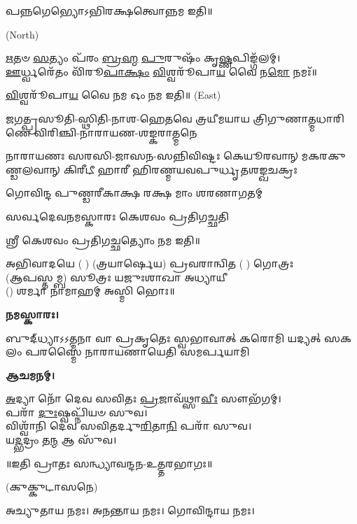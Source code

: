 𑌪𑌨𑍍𑌨𑌗𑍇𑌭𑍍𑌯𑍋𑌽𑌭𑌿𑌰𑌕𑍍𑌷𑌤𑍍𑌵𑍋𑌨𑍍𑌨𑌮 𑌇𑌤𑌿॥

 {\scriptsize (North)}

\-\ul{𑌋}\-𑌤𑍞 \ul{𑌸}\-𑌤𑍍𑌯𑌂 𑌪᳴𑌰𑌂 \ul{𑌬𑍍𑌰}\-\-\ul{𑌹𑍍𑌮} \ul{𑌪𑍁}\-𑌰𑍁𑌷𑌂᳴ 𑌕𑍃\-\ul{𑌷𑍍𑌣}\-𑌪𑌿𑌙𑍍𑌗᳴𑌲𑌮𑍍।\\
\-\ul{𑌊}\-𑌰𑍍𑌧𑍍𑌵𑌰𑍇᳴𑌤𑌂 𑌵𑌿᳴𑌰𑍂\-\ul{𑌪𑌾}\-\-\ul{𑌕𑍍𑌷𑌂} \ul{𑌵𑌿}\-𑌶𑍍𑌵𑌰𑍂᳴𑌪𑌾\-\ul{𑌯} 𑌵𑍈 𑌨\-\ul{𑌮𑍋} 𑌨𑌮𑌃᳴॥


\-\ul{𑌵𑌿}\-𑌶𑍍𑌵𑌰𑍂᳴𑌪𑌾\-\ul{𑌯} 𑌵𑍈 𑌨𑌮 𑌓𑌂 𑌨𑌮 𑌇𑌤𑌿॥
{\scriptsize (East)}

{𑌜𑌗𑌤𑍍𑌪𑍍𑌰𑌸𑍂𑌤𑌿-𑌸𑍍𑌥𑌿𑌤𑌿-𑌨𑌾𑌶-𑌹𑍇𑌤𑌵𑍇}
{𑌤𑍍𑌰𑌯𑍀𑌮𑌯𑌾𑌯 𑌤𑍍𑌰𑌿𑌗𑍁𑌣𑌾𑌤𑍍𑌮𑌧𑌾𑌰𑌿𑌣𑍇}
{𑌵𑌿𑌰𑌿𑌞𑍍𑌚𑌿-𑌨𑌾𑌰𑌾𑌯𑌣-𑌶𑌙𑍍𑌕𑌰𑌾𑌤𑍍𑌮𑌨𑍇}

{𑌨𑌾𑌰𑌾𑌯𑌣𑌃 𑌸𑌰𑌸𑌿-𑌜𑌾𑌸𑌨-𑌸𑌨𑍍𑌨𑌿𑌵𑌿𑌷𑍍𑌟𑌃}
{𑌕𑍇𑌯𑍂𑌰𑌵𑌾𑌨𑍍 𑌮𑌕𑌰𑌕𑍁𑌣𑍍𑌡𑌲𑌵𑌾𑌨𑍍 𑌕𑌿𑌰𑍀𑌟𑍀}
{𑌹𑌾𑌰𑍀 𑌹𑌿𑌰𑌣𑍍𑌮𑌯𑌵𑌪𑍁𑌰𑍍𑌧𑍃𑌤𑌶𑌙𑍍𑌖𑌚𑌕𑍍𑌰𑌃}

{𑌗𑍋𑌵𑌿𑌨𑍍𑌦 𑌪𑍁𑌣𑍍𑌡𑌰𑍀𑌕𑌾𑌕𑍍𑌷 𑌰𑌕𑍍𑌷 𑌮𑌾𑌂 𑌶𑌰𑌣𑌾𑌗𑌤𑌮𑍍}

{𑌸𑌰𑍍𑌵𑌦𑍇𑌵𑌨𑌮𑌸𑍍𑌕𑌾𑌰𑌃 𑌕𑍇𑌶𑌵𑌂 𑌪𑍍𑌰𑌤𑌿𑌗𑌚𑍍𑌛𑌤𑌿}

𑌶𑍍𑌰𑍀 𑌕𑍇𑌶𑌵𑌂 𑌪𑍍𑌰𑌤𑌿𑌗𑌚𑍍𑌛𑌤𑍍𑌯𑍋𑌂 𑌨𑌮 𑌇𑌤𑌿॥

𑌅𑌭𑌿𑌵𑌾𑌦𑌯𑍇 ( ) (𑌤𑍍𑌰𑌯𑌾𑌰𑍍𑌷𑍇𑌯) 𑌪𑍍𑌰𑌵𑌰𑌾𑌨𑍍𑌵𑌿𑌤 ( ) 𑌗𑍋𑌤𑍍𑌰𑌃\\
(𑌆𑌪𑌸𑍍𑌤𑌮𑍍𑌬) 𑌸𑍂𑌤𑍍𑌰𑌃 𑌯𑌜𑍁𑌃𑌶𑌾𑌖𑌾 𑌅𑌧𑍍𑌯𑌾𑌯𑍀\\
() 𑌶𑌰𑍍𑌮𑌾 𑌨𑌾𑌮𑌾𑌹𑌮𑍍 𑌅𑌸𑍍𑌮𑌿 𑌭𑍋𑌃॥

\textbf{𑌨𑌮𑌸𑍍𑌕𑌾𑌰𑌃।}

{𑌬𑍁𑌦𑍍‌𑌧𑍍𑌯𑌾𑌽𑌽𑌤𑍍𑌮𑌨𑌾 𑌵𑌾 𑌪𑍍𑌰𑌕𑍃𑌤𑍇𑌃 𑌸𑍍𑌵𑌭𑌾𑌵𑌾𑌤𑍍}
{𑌕𑌰𑍋𑌮𑌿 𑌯𑌦𑍍𑌯𑌤𑍍 𑌸𑌕𑌲𑌂 𑌪𑌰𑌸𑍍𑌮𑍈}
{𑌨𑌾𑌰𑌾𑌯𑌣𑌾𑌯𑍇𑌤𑌿 𑌸𑌮𑌰𑍍𑌪𑌯𑌾𑌮𑌿}

\textbf{𑌆𑌚𑌮𑌨𑌮𑍍।}


\-\ul{𑌅}\-𑌦𑍍𑌯𑌾 𑌨𑍋᳴ 𑌦𑍇𑌵 𑌸𑌵𑌿𑌤𑌃 \ul{𑌪𑍍𑌰}\-𑌜𑌾𑌵᳴𑌥𑍍𑌸𑌾\-\ul{𑌵𑍀𑌃} 𑌸𑍗𑌭᳴𑌗𑌮𑍍।\\
𑌪𑌰𑌾᳴ \ul{𑌦𑍁𑌃}\-𑌷𑍍𑌵𑌪𑍍𑌨𑌿᳴𑌯𑍞 𑌸𑍁𑌵।\\
𑌵𑌿𑌶𑍍𑌵𑌾᳴𑌨𑌿 𑌦𑍇𑌵 𑌸𑌵𑌿𑌤𑌰𑍍𑌦𑍁\-\ul{𑌰𑌿}\-𑌤𑌾\-\ul{𑌨𑌿} 𑌪𑌰𑌾᳴ 𑌸𑍁𑌵।\\
𑌯\-\ul{𑌦𑍍𑌭}\-𑌦𑍍𑌰𑌂 𑌤\-\ul{𑌨𑍍𑌮} 𑌆 𑌸𑍁᳴𑌵।

\centerline{॥𑌇𑌤𑌿 𑌪𑍍𑌰𑌾𑌤𑌃 𑌸𑌨𑍍𑌧𑍍𑌯𑌾𑌵𑌨𑍍𑌦𑌨-𑌉𑌤𑍍𑌤𑌰𑌭𑌾𑌗𑌃॥}


\renewcommand{\sectionmark}[1]{%
\markboth{\large #1 (𑌮𑌾𑌧𑍍𑌯𑌾𑌹𑍍𑌨𑌿𑌕𑌮𑍍)}{}}


(𑌕𑍁𑌕𑍍𑌕𑍁𑌟𑌾𑌸𑌨𑍇)

𑌅𑌚𑍍𑌯𑍁𑌤𑌾𑌯 𑌨𑌮𑌃। 𑌅𑌨𑌨𑍍𑌤𑌾𑌯 𑌨𑌮𑌃। 𑌗𑍋𑌵𑌿𑌨𑍍𑌦𑌾𑌯 𑌨𑌮𑌃। 

